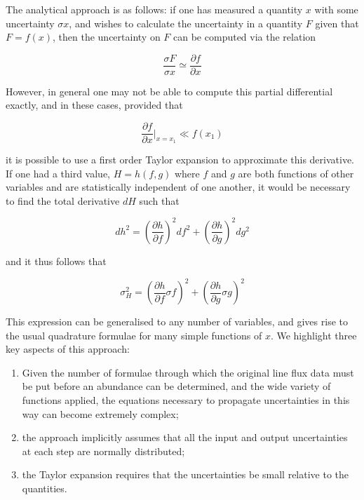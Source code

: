 \documentclass[useAMS,usenatbib]{mn2e}
\begin{document}
The analytical approach is as follows: if one has measured a quantity $x$ with some uncertainty $\sigma x$, and wishes to calculate the uncertainty in a quantity $F$ given that $F = f(x)$, then the uncertainty on $F$ can be computed via the relation 

\begin{equation}
  \frac{\sigma F}{\sigma x} \simeq \frac{\partial f}{\partial x}
\end{equation}

However, in general one may not be able to compute this partial differential exactly, and in these cases, provided that

\begin{equation}
  \frac{\partial f}{\partial x}|_{x=x_1} \ll f(x_1)
\end{equation}

it is possible to use a first order Taylor expansion to approximate this derivative.  If one had a third value, $H = h(f, g)$ where $f$ and $g$ are both functions of other variables and are statistically independent of one another, it would be necessary to find the total derivative $dH$ such that

\begin{equation}
dh^2 = \left(\frac{\partial h}{\partial f}\right)^2df^2 + \left(\frac{\partial h}{\partial g}\right)^2dg^2
\end{equation}

and it thus follows that

\begin{equation}
\sigma^2_H = \left(\frac{\partial h}{\partial f}\sigma f\right)^2 + \left(\frac{\partial h}{\partial g}\sigma g\right)^2
\end{equation}

This expression can be generalised to any number of variables, and gives rise to the usual quadrature formulae for many simple functions of $x$.  We highlight three key aspects of this approach:

\begin{enumerate}
  \item Given the number of formulae through which the original line flux data must be put before an abundance can be determined, and the wide variety of functions applied, the equations necessary to propagate uncertainties in this way can become extremely complex;
  \item the approach implicitly assumes that all the input and output uncertainties at each step are normally distributed;
  \item the Taylor expansion requires that the uncertainties be small relative to the quantities.
\end{enumerate}
\end{document}
